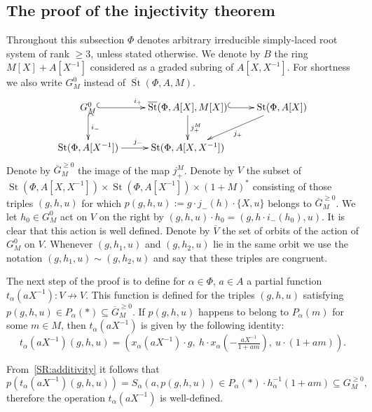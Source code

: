 \documentclass[oneside, 8pt]{amsart}
\theoremstyle{remark}
\theoremstyle{definition}
\DeclareMathOperator{\St}{St}
\newcommand{\inv}{^{-1}}
\numberwithin{equation}{section}
\begin{document}
\subsection{The proof of the injectivity theorem}
Throughout this subsection $\Phi$ denotes arbitrary irreducible simply-laced root system of rank $\geq 3$, unless stated otherwise.
We denote by $B$ the ring $M[X] + A[X^{-1}]$ considered as a graded subring of $A[X, X^{-1}]$.
For shortness we also write $G_M^0$ instead of $\overline{\St}(\Phi, A, M)$.
\[ \xymatrix{ G_M^0 \ar@{^{(}->}[r]^{i_+} \ar@{^{(}->}[d]^{i_-} & \overline{\St}(\Phi, A[X], M[X]) \ar^{j_+^M}[d] \ar@{^{(}->}[r] & \St(\Phi, A[X]) \ar[dl]^{j_+} \\
              \St(\Phi, A[X\inv]) \ar[r]^{j_-} & \St(\Phi, A[X, X^{-1}]) &  } \] 
Denote by $\overline{G}^{\geq 0}_M$ the image of the map $j_+^M$. 
Denote by $V$ the subset of $\St(\Phi, A[X, X^{-1}]) \times \St(\Phi, A[X\inv]) \times (1 + M)^*$ consisting of those triples $(g, h, u)$ for which 
$p(g, h, u) := g \cdot j_-(h) \cdot \{ X, u \}$ belongs to $\overline{G}_M^{\geq 0}$.
We let $h_0 \in G_M^0$ act on $V$ on the right by $(g, h, u) \cdot h_0 = (g, h \cdot i_-(h_0), u)$.
It is clear that this action is well defined.
Denote by $\overline{V}$ the set of orbits of the action of $G_M^0$ on $V$.
Whenever $(g, h_1, u)$ and $(g, h_2, u)$ lie in the same orbit we use the notation $(g, h_1, u) \sim (g, h_2, u)$ and say that these triples are congruent.

The next step of the proof is to define for $\alpha \in \Phi$, $a \in A$ a partial function $t_\alpha(aX^{-1}) \colon V \not\to V$.
This function is defined for the triples $(g, h, u)$ satisfying $p(g, h, u) \in P_\alpha(*) \subseteq \overline{G}_M^{\geq 0}$.
If $p(g, h, u)$ happens to belong to $P_\alpha(m)$ for some $m \in M$, then $t_\alpha(aX^{-1})$ is given by the following identity:
\[ t_\alpha(aX^{-1}) (g, h, u) = \left( x_\alpha(aX^{-1})\cdot g ,\ h \cdot x_\alpha\left(-\tfrac{aX^{-1}}{1 + am}\right),\ u \cdot (1 + am)\right).\]

From~\cref{SR:additivity} it follows that
\[p\left(t_\alpha(aX^{-1}) (g, h, u)\right) = S_\alpha(a, p(g, h, u)) \in P_\alpha(*) \cdot h_{\alpha}^{-1}(1+am) \subseteq G_M^{\geq 0},\]
therefore the operation $t_\alpha(aX^{-1})$ is well-defined.
\end{document}
